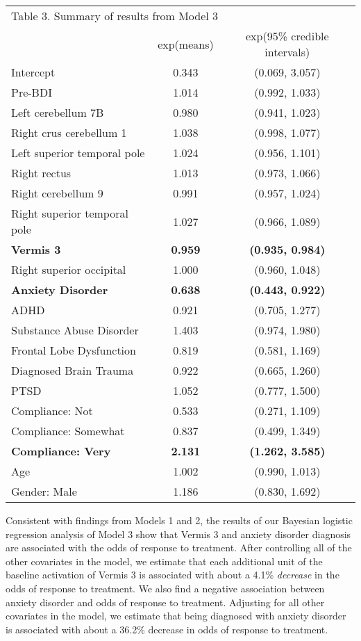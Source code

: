 \documentclass[12pt,doc]{apa}
\begin{document}
\begin{tabular}{l c c}
\multicolumn{3}{l}{Table 3. Summary of results from Model 3} \\

& exp(means) & exp(95\% credible intervals) \\
\hline
Intercept & 0.343 & (0.069, 3.057) \\
Pre-BDI & 1.014 & (0.992, 1.033) \\
Left cerebellum 7B & 0.980 & (0.941, 1.023) \\
Right crus cerebellum 1 & 1.038 & (0.998, 1.077) \\
Left superior temporal pole & 1.024 & (0.956, 1.101) \\
Right rectus & 1.013 & (0.973, 1.066) \\
Right cerebellum 9 & 0.991 &(0.957, 1.024) \\
Right superior temporal pole & 1.027 & (0.966, 1.089) \\
\textbf{Vermis 3} & \textbf{0.959} & \textbf{(0.935, 0.984)} \\
Right superior occipital & 1.000 & (0.960, 1.048) \\
\textbf{Anxiety Disorder} & \textbf{0.638} & \textbf{(0.443, 0.922)} \\
ADHD & 0.921 & (0.705, 1.277) \\
Substance Abuse Disorder & 1.403 & (0.974, 1.980) \\
Frontal Lobe Dysfunction & 0.819 & (0.581, 1.169) \\
Diagnosed Brain Trauma & 0.922 & (0.665, 1.260) \\
PTSD & 1.052 & (0.777, 1.500) \\
Compliance: Not & 0.533 & (0.271, 1.109) \\
Compliance: Somewhat & 0.837 & (0.499, 1.349) \\
\textbf{Compliance: Very} & \textbf{2.131} & \textbf{(1.262, 3.585)} \\
Age & 1.002 & (0.990, 1.013) \\
Gender: Male & 1.186 & (0.830, 1.692) \\

\end{tabular}

Consistent with findings from Models 1 and 2, the results of our Bayesian logistic regression analysis of Model 3 show that Vermis 3 and anxiety disorder diagnosis are associated with the odds of response to treatment. After controlling all of the other covariates in the model, we estimate that each additional unit of the baseline activation of Vermis 3 is associated with about a 4.1\% \emph{decrease} in the odds of response to treatment. We also find a negative association between anxiety disorder and odds of response to treatment. Adjusting for all other covariates in the model, we estimate that being diagnosed with anxiety disorder is associated with about a 36.2\% decrease in odds of response to treatment. 
\end{document}
